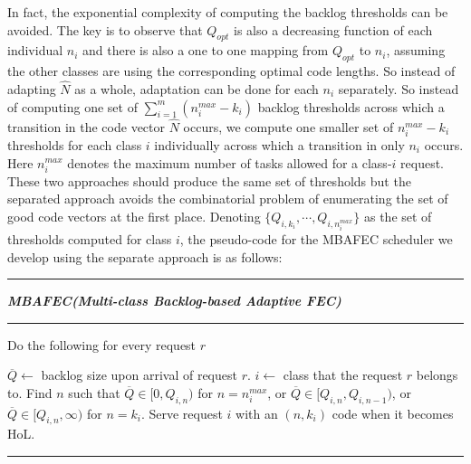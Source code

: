 \documentclass[journal]{IEEEtran}
\newcommand{\multiclass}{{MBAFEC}\xspace}
\newcommand{\codeVec}{\hat{N}}
\begin{document}
In fact, the exponential complexity of computing the backlog thresholds can be avoided. The key is to observe that $Q_{opt}$ is also a decreasing function of each individual $n_i$ and there is also a one to one mapping from $Q_{opt}$ to  $n_i$, assuming the other classes are using the corresponding optimal code lengths. So instead of adapting $\codeVec$ as a whole, adaptation can be done for each $n_i$ separately. So instead of computing one set of $\sum_{i=1}^m(n_i^{max}-k_i)$ backlog thresholds across which a transition in the code vector $\codeVec$ occurs, we compute one smaller set of $n_i^{max}-k_i$ thresholds for each class $i$ individually across which a transition in only $n_i$ occurs. Here $n_i^{max}$ denotes the maximum number of tasks allowed for a class-$i$ request. These two approaches should produce the same set of thresholds but the separated approach avoids the combinatorial problem of enumerating the set of good code vectors at the first place. Denoting $\{Q_{i,k_i},\cdots,Q_{i,n_i^{max}}\}$ as the set of thresholds computed for class $i$, the pseudo-code for the \multiclass scheduler we develop using the separate approach is as follows:

\vspace{4pt}
\hrule
\vspace{2pt}
\noindent \textit{\textbf{\multiclass (Multi-class Backlog-based Adaptive FEC)}}
\hrule
\vspace{2pt}


\noindent  Do the following for every request $r$

\begin{algorithmic} [1]

\STATE $\overline{Q} \leftarrow $ backlog size upon arrival of request $r$.
\STATE $i\leftarrow$ class that the  request $r$ belongs to.
\STATE Find $n$ such that $\overline{Q}\in [0,Q_{i,n})$ for $n=n_i^{max}$, or $\overline{Q}\in [Q_{i,n}, Q_{i,n-1})$, or $\overline{Q}\in [Q_{i,n},\infty)$ for $n=k_i$.
\STATE Serve request $i$ with an $(n,k_i)$ code when it becomes HoL.
\end{algorithmic}
\hrule

~
\end{document}
